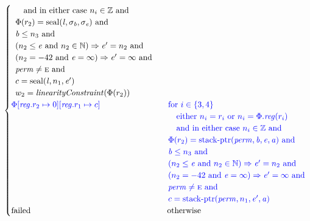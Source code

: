 \documentclass[a4paper]{article}
\newcommand{\tand}{\text{ and }}
\newcommand{\totherwise}{\text{otherwise }}
\newcommand{\sourcecolor}{\color{blue}}
\newcommand{\src}[1]{{\sourcecolor #1}}
\newcommand{\nats}{\mathbb{N}}
\newcommand{\ints}{\mathbb{Z}}
\newcommand{\update}[2]{[#1 \mapsto #2]}
\newcommand{\updReg}[2]{\update{\reg.#1}{#2}}
\newcommand{\shareddom}[1]{\mathrm{#1}}
\newcommand{\perm}{\var{perm}}
\newcommand{\lin}{\var{l}}
\newcommand{\stkptr}[1]{\mathrm{stack\text{-}ptr}(#1)}
\newcommand{\seal}[1]{\shareddom{seal}(#1)}
\newcommand{\failed}{\mathrm{failed}}
\newcommand{\var}[1]{\mathit{#1}}
\newcommand{\reg}{\var{reg}}
\newcommand{\baddr}{\var{b}}
\newcommand{\eaddr}{\var{e}}
\newcommand{\aaddr}{\var{a}}
\newcommand{\plainperm}[1]{\textsc{#1}}
\newcommand{\enter}{\plainperm{e}}
\newcommand{\plainfun}[2]{
  \ifthenelse{\equal{#2}{}}
  {\mathit{#1}}
  {\mathit{#1}(#2)}
}
\newcommand{\linCons}[1]{\plainfun{linearityConstraint}{#1}}
\begin{document}
\begin{align*}
\begin{cases}
\begin{array}[t]{l}
                                                   \quad \text{and in either case $n_i \in \ints$ and} \\
                                                   \Phi(r_2) = \seal{\lin,\sigma_\baddr,\sigma_\eaddr} \tand \\
                                                   \baddr \leq n_3 \tand \\
                                                   (n_2 \leq \eaddr \tand n_2 \in \nats) \Rightarrow \eaddr' = n_2 \tand \\
                                                   (n_2 = -42 \tand \eaddr = \infty) \Rightarrow \eaddr' = \infty \tand\\
                                                   \perm \neq \enter \tand\\
                                                   c = \seal{\lin,n_1,\eaddr'}\\
                                                   w_2 = \linCons{\Phi(r_2)}
                                                 \end{array}
\\
                                                 \src{\Phi\updReg{r_2}{0}\updReg{r_1}{c}} &
                                                 \sourcecolor\left.
                                                 \arraycolsep=0pt
                                                 \begin{array}[t]{l}
                                                   \text{for $i \in \{3, 4\}$ } \\
                                                   \quad \text{either $n_i = r_i$ or $n_i = \Phi.\reg(r_i)$}\\
                                                   \quad \text{and in either case $n_i \in \ints$ and} \\
                                                   \Phi(r_2) = \stkptr{\perm,\baddr,\eaddr,\aaddr} \tand \\
                                                   \baddr \leq n_3 \tand \\
                                                   (n_2 \leq \eaddr \tand n_2 \in \nats) \Rightarrow \eaddr' = n_2 \tand\\
                                                   (n_2 = -42 \tand \eaddr = \infty) \Rightarrow \eaddr' = \infty \tand\\
                                                   \perm \neq \enter \tand\\
                                                   c = \stkptr{\perm,n_1,\eaddr',\aaddr}\\
                                                 \end{array}\right.\\
                                                 \failed & \totherwise 
                                               \end{cases}
\end{align*}
\end{document}
